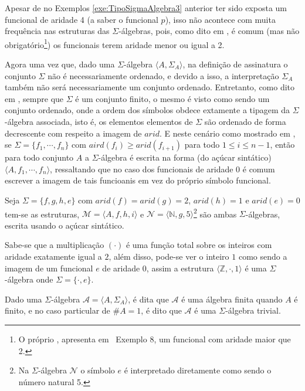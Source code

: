 Apesar de no Exemplos \ref{exe:TipoSigmaAlgebra3} anterior ter sido exposta um funcional de aridade 4 (a saber o funcional $p$), isso não acontece com muita frequência nas estruturas das $\Sigma$-álgebras, pois, como dito em \cite{stanley1981}, é comum (mas não obrigatório\footnote{O próprio \cite{stanley1981}, apresenta em \textsection \ Exemplo 8, um funcional com aridade maior que 2.}) os funcionais terem aridade menor ou igual a 2.

Agora uma vez que, dado uma $\Sigma$-álgebra $\langle A, \Sigma_A \rangle$, na definição de assinatura o conjunto $\Sigma$ não é necessariamente ordenado, e devido a isso, a interpretação $\Sigma_A$ também não será necessariamente um conjunto ordenado. Entretanto, como dito em \cite{carmo2013}, sempre que $\Sigma$ é um conjunto finito, o mesmo é visto como sendo um conjunto ordenado, onde a ordem dos símbolos obdece extamente a tipagem da $\Sigma$-álgebra associada, isto é, os elementos elementos de $\Sigma$ são ordenado de forma decrescente com respeito a imagem de $arid$. E neste cenário como mostrado em \cite{carmo2013, klaus2001, stanley1981,fmcbook}, se $\Sigma = \{f_1, \cdots, f_n\}$ com $aird(f_i) \geq arid(f_{i+1})$ para todo $1 \leq i \leq n-1$, então para todo conjunto $A$ a $\Sigma$-álgebra é escrita na forma (do açúcar sintático) $\langle A, f_1, \cdots, f_n \rangle$, ressaltando que no caso dos funcionais de aridade $0$ é comum escrever a imagem de tais funcioanis em vez do próprio símbolo funcional. 

\begin{exemplo}
  Seja $\Sigma = \{f, g, h, e\}$ com $arid(f) = arid(g) = 2$, $arid(h) = 1$ e $arid(e) = 0$ tem-se as estruturas, $\mathcal{M} = \langle A, f, h, i\rangle$ e $\mathcal{N} = \langle \mathbb{N}, g, 5\rangle$\footnote{Na $\Sigma$-álgebra $\mathcal{N}$ o símbolo $e$ é interpretado diretamente como sendo o número natural 5.} são ambas $\Sigma$-álgebras, escrita usando o açúcar sintático.
\end{exemplo}

\begin{exemplo}
  Sabe-se que a multiplicação $(\cdot)$ é uma função total sobre os inteiros com aridade exatamente igual a $2$, além disso, pode-se ver o inteiro $1$ como sendo a imagem de um funcional $e$ de aridade $0$, assim a estrutura $\langle \mathbb{Z}, \cdot, 1 \rangle$ é uma $\Sigma$-álgebra onde $\Sigma = \{\cdot, e\}$.
\end{exemplo}

Dado uma $\Sigma$-álgebra $\mathcal{A} = \langle A, \Sigma_A \rangle$, é dita que $\mathcal{A}$ é uma álgebra finita quando $A$ é finito, e no caso particular de $\#A = 1$, é dito que $\mathcal{A}$ é uma $\Sigma$-álgebra trivial.

